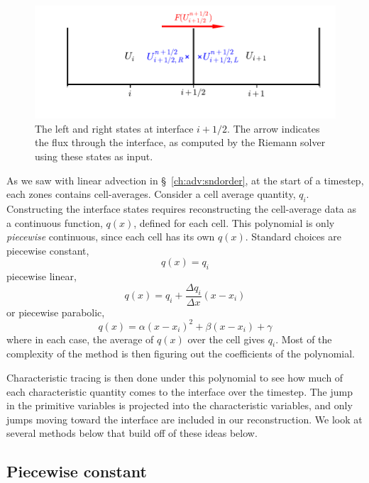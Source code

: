 \begin{figure}[t]
\centering
\includegraphics[width=\linewidth]{riemann_comp}
\caption[The left and right states for the Riemann
  problem]{\label{fig:riemann} The left and right states at interface
  $i+1/2$.  The arrow indicates the flux through the interface, as
  computed by the Riemann solver using these states as input.}
\end{figure}

As we saw with linear advection in \S~\ref{ch:adv:sndorder},
at the start of a timestep, each zones contains cell-averages.
Consider a cell average quantity, $q_i$.
Constructing the interface states requires reconstructing the
cell-average data as a continuous function, $q(x)$, defined for
each cell.  This polynomial is only {\em piecewise} continuous, since
each cell has its own $q(x)$.  Standard choices are piecewise constant,
\begin{equation}
q(x) = q_i
\end{equation}
piecewise linear,
\begin{equation}
q(x) = q_i + \frac{\Delta q_i}{\Delta x}(x - x_i)
\end{equation}
or piecewise parabolic,
\begin{equation}
q(x) = \alpha (x - x_i)^2 + \beta (x - x_i) + \gamma
\end{equation}
where in each case, the average of $q(x)$ over the cell gives $q_i$.
Most of the complexity of the method is then figuring out the coefficients
of the polynomial.

Characteristic tracing is then done under this polynomial to see how
much of each characteristic quantity comes to the interface over the
timestep.  The jump in the primitive variables is projected into the
characteristic variables, and only jumps moving toward the interface
are included in our reconstruction.  We look at several methods below
that build off of these ideas below.

\subsection{Piecewise constant}

